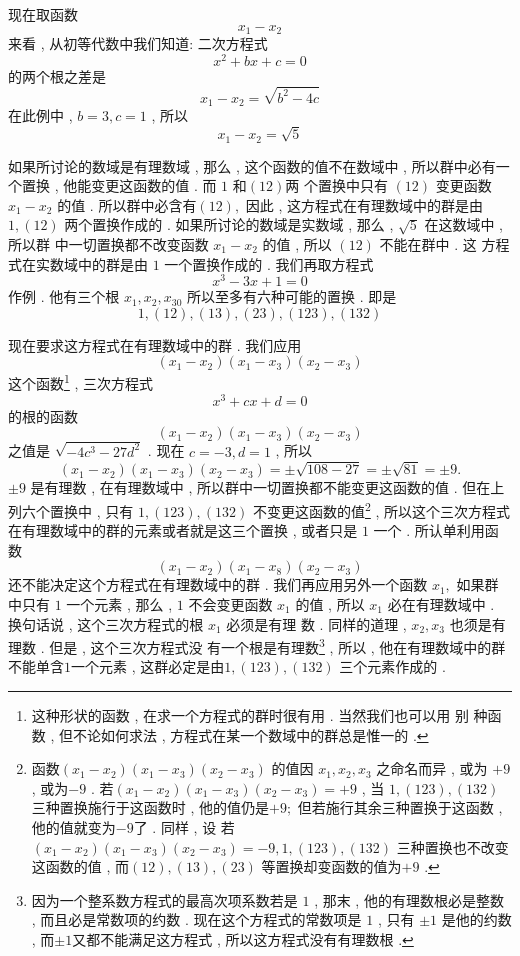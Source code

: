 现在取函数
\[
x_{1}-x_{2}
\]
来看 , 从初等代数中我们知道: 二次方程式
\[
x^{2}+b x+c=0
\]
的两个根之差是
\[
x_{1}-x_{2}=\sqrt{b^{2}-4 c}
\]
在此例中 ,  $b=3 ,  c=1$ ,  所以
\[
x_{1}-x_{2}=\sqrt{5}
\]

如果所讨论的数域是有理数域 , 那么 , 这个函数的值不在数域中 , 所以群中必有一个置换 , 他能变更这函数的值 . 而 $1$ 和$(12)$两 个置换中只有 $(12)$ 变更函数$x_{1}-x_{2}$ 的值 . 所以群中必含有$(12) , $
因此 , 这方程式在有理数域中的群是由 $1 , (12)$
两个置换作成的 .  如果所讨论的数域是实数域 , 那么 ,  $\sqrt{5}$ 在这数域中 , 所以群 中一切置换都不改变函数 $x_{1}-x_{2}$ 的值 , 所以 $(12)$ 不能在群中 . 这 方程式在实数域中的群是由 $1$ 一个置换作成的 .  我们再取方程式
\[
x^{3}-3 x+1=0
\]
作例 . 他有三个根 $x_{1} ,  x_{2} ,  x_{30}$ 所以至多有六种可能的置换 .  即是
\[
1 , (12) , (13) , (23) , (123) , (132)
\]

现在要求这方程式在有理数域中的群 . 我们应用
\[
\left(x_{1}-x_{2}\right)\left(x_{1}-x_{3}\right)\left(x_{2}-x_{3}\right)
\]
这个函数\footnote{这种形状的函数 , 在求一个方程式的群时很有用 . 当然我们也可以用 别 种函 数 ,  但不论如何求法 , 方程式在某一个数域中的群总是惟一的 . } , 三次方程式
\[
x^{3}+c x+d=0
\]
的根的函数
\[
\left(x_{1}-x_{2}\right)\left(x_{1}-x_{3}\right)\left(x_{2}-x_{3}\right)
\]
之值是 $\sqrt{-4 c^{3}-27 d^{2}}$  . 现在 $c=-3 ,  d=1$ ,  所以
\[
\left(x_{1}-x_{2}\right)\left(x_{1}-x_{3}\right)\left(x_{2}-x_{3}\right)=\pm \sqrt{108-27}=\pm \sqrt{81}=\pm 9 . 
\]
$\pm 9$ 是有理数 , 在有理数域中 ,  所以群中一切置换都不能变更这函数的值 . 但在上列六个置换中 , 只有 $1 , (123) , (132)$ 不变更这函数的值\footnote{函数$\left(x_{1}-x_{2}\right)\left(x_{1}-x_{3}\right)\left(x_{2}-x_{3}\right)$ 的值因 $x_{1} ,  x_{2} ,  x_{3}$ 之命名而异 ,  或为 $+9$ ,  或为$- 9$ . 若$\left(x_{1}-x_{2}\right)\left(x_{1}-x_{3}\right)\left(x_{2}-x_{3}\right)=+9$ ,  当 $1 , (123) , (132)$ 三种置换施行于这函数时 ,  他的值仍是$+9;$ 但若施行其余三种置换于这函数 , 他的值就变为$-9$了 . 同样 , 设 若 $\left(x_{1}-x_{2}\right)\left(x_{1}-x_{3}\right)\left(x_{2}-x_{3}\right)=-9 , 1 , (123) , (132)$ 三种置换也不改变这函数的值 ,  而$(12)  ,  (13)  ,  (23)$ 等置换却变函数的值为$+9$ . } , 所以这个三次方程式在有理数域中的群的元素或者就是这三个置换 , 或者只是 $1$ 一个 . 所认单利用函数
\[
\left(x_{1}-x_{2}\right)\left(x_{1}-x_{8}\right)\left(x_{2}-x_{3}\right)
\]
还不能决定这个方程式在有理数域中的群 . 我们再应用另外一个函数
$x_{1} , $
如果群中只有 $1$ 一个元素 , 那么 , $1$ 不会变更函数 $x_{1}$ 的值 , 所以 $x_{1}$
必在有理数域中 . 换句话说 ,  这个三次方程式的根 $x_{1}$ 必须是有理
数 . 同样的道理 ,  $x_{2} ,  x_{3}$ 也须是有理数 . 但是 , 这个三次方程式没
有一个根是有理数\footnote{因为一个整系数方程式的最高次项系数若是 $1$ ,  那末 ,  他的有理数根必是整数 ,  而且必是常数项的约数 . 现在这个方程式的常数项是 $1$ ,  只有 $\pm 1$ 是他的约数 , 而$\pm 1$又都不能满足这方程式 , 所以这方程式没有有理数根 . } , 所以 , 他在有理数域中的群不能单含$1$一个元素 , 这群必定是由$1 , (123) , (132)$ 三个元素作成的 .  

